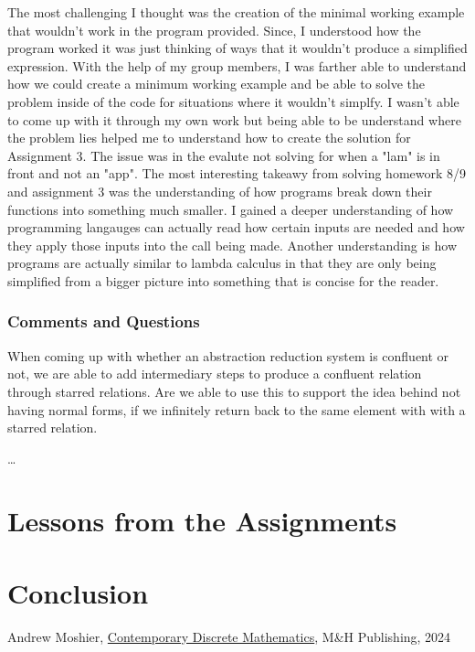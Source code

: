 \documentclass{article}
\theoremstyle{theorem}
\theoremstyle{definition}
\theoremstyle{remark}
\begin{document}
The most challenging I thought was the creation of the minimal working example that wouldn't work in the program provided. Since, I understood
how the program worked it was just thinking of ways that it wouldn't produce a simplified expression. With the help of my group members, I was 
farther able to understand how we could create a minimum working example and be able to solve the problem inside of the code for situations where 
it wouldn't simplfy. I wasn't able to come up with it through my own work but being able to be understand where the problem lies helped me to understand 
how to create the solution for Assignment 3. The issue was in the evalute not solving for when a "lam" is in front and not an "app". The most interesting
takeawy from solving homework 8/9 and assignment 3 was the understanding of how programs break down their functions into something much smaller. I 
gained a deeper understanding of how programming langauges can actually read how certain inputs are needed and how they apply those inputs into the 
call being made. Another understanding is how programs are actually similar to lambda calculus in that they are only being simplified from a bigger picture
into something that is concise for the reader. 

\subsubsection{Comments and Questions}

When coming up with whether an abstraction reduction system is confluent or not, we are able to add intermediary steps to produce a confluent relation through starred relations. 
Are we able to use this to support the idea behind not having normal forms, if we infinitely return back to the same element with with a starred relation.

\ldots

\section{Lessons from the Assignments}

\section{Conclusion}\label{conclusion}

\begin{thebibliography}{99}
 Andrew Moshier, \href{https://canvas.chapman.edu/courses/66029/files/6581500?module_item_id=2280521}{Contemporary Discrete Mathematics}, M\&H Publishing, 2024
\end{thebibliography}
\end{document}
